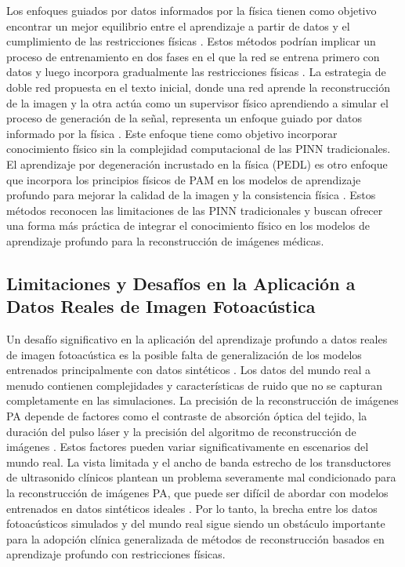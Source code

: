 Los enfoques guiados por datos informados por la física tienen como objetivo encontrar un mejor equilibrio entre el aprendizaje a partir de datos y el cumplimiento de las restricciones físicas \cite{hauptmann_2024}. Estos métodos podrían implicar un proceso de entrenamiento en dos fases en el que la red se entrena primero con datos y luego incorpora gradualmente las restricciones físicas \cite{hauptmann_2024}. La estrategia de doble red propuesta en el texto inicial, donde una red aprende la reconstrucción de la imagen y la otra actúa como un supervisor físico aprendiendo a simular el proceso de generación de la señal, representa un enfoque guiado por datos informado por la física \cite{resolution_enhancement_2024}. Este enfoque tiene como objetivo incorporar conocimiento físico sin la complejidad computacional de las PINN tradicionales. El aprendizaje por degeneración incrustado en la física (PEDL) es otro enfoque que incorpora los principios físicos de PAM en los modelos de aprendizaje profundo para mejorar la calidad de la imagen y la consistencia física \cite{enhanced_pam_2024}. Estos métodos reconocen las limitaciones de las PINN tradicionales y buscan ofrecer una forma más práctica de integrar el conocimiento físico en los modelos de aprendizaje profundo para la reconstrucción de imágenes médicas.

\subsection{Limitaciones y Desafíos en la Aplicación a Datos Reales de Imagen Fotoacústica}

Un desafío significativo en la aplicación del aprendizaje profundo a datos reales de imagen fotoacústica es la posible falta de generalización de los modelos entrenados principalmente con datos sintéticos \cite{hauptmann_2024}. Los datos del mundo real a menudo contienen complejidades y características de ruido que no se capturan completamente en las simulaciones. La precisión de la reconstrucción de imágenes PA depende de factores como el contraste de absorción óptica del tejido, la duración del pulso láser y la precisión del algoritmo de reconstrucción de imágenes \cite{hauptmann_2024}. Estos factores pueden variar significativamente en escenarios del mundo real. La vista limitada y el ancho de banda estrecho de los transductores de ultrasonido clínicos plantean un problema severamente mal condicionado para la reconstrucción de imágenes PA, que puede ser difícil de abordar con modelos entrenados en datos sintéticos ideales \cite{review_deep_learning_2022}. Por lo tanto, la brecha entre los datos fotoacústicos simulados y del mundo real sigue siendo un obstáculo importante para la adopción clínica generalizada de métodos de reconstrucción basados en aprendizaje profundo con restricciones físicas.

